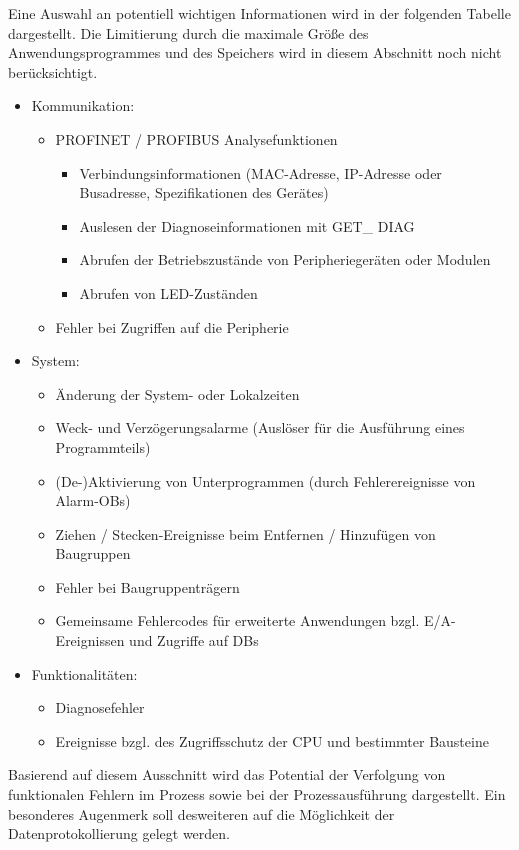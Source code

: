 Eine Auswahl an potentiell wichtigen Informationen wird in der folgenden Tabelle dargestellt. Die Limitierung durch die maximale Größe des Anwendungsprogrammes und des Speichers wird in diesem Abschnitt noch nicht berücksichtigt. 
\begin{itemize}
\item Kommunikation: 
\begin{itemize}
\item PROFINET / PROFIBUS Analysefunktionen 
\begin{itemize}
\item Verbindungsinformationen (MAC-Adresse, IP-Adresse oder Busadresse, Spezifikationen des Gerätes)
\item Auslesen der Diagnoseinformationen mit GET\_ DIAG
\item Abrufen der Betriebszustände von Peripheriegeräten oder Modulen
\item Abrufen von LED-Zuständen
\end{itemize}
\item Fehler bei Zugriffen auf die Peripherie
\end{itemize}

\item System:
\begin{itemize}
\item Änderung der System- oder Lokalzeiten
\item Weck- und Verzögerungsalarme (Auslöser für die Ausführung eines Programmteils)
\item (De-)Aktivierung von Unterprogrammen (durch Fehlerereignisse von Alarm-OBs)
\item Ziehen / Stecken-Ereignisse beim Entfernen / Hinzufügen von Baugruppen
\item Fehler bei Baugruppenträgern 
\item Gemeinsame Fehlercodes für erweiterte Anwendungen bzgl. E/A-Ereignissen und Zugriffe auf DBs
\end{itemize}


\item Funktionalitäten:
\begin{itemize}
\item Diagnosefehler
\item Ereignisse bzgl. des Zugriffsschutz der CPU und bestimmter Bausteine
\end{itemize}
\end{itemize}

Basierend auf diesem Ausschnitt wird das Potential der Verfolgung von funktionalen Fehlern im Prozess sowie bei der Prozessausführung dargestellt. Ein besonderes Augenmerk soll desweiteren auf die Möglichkeit der Datenprotokollierung gelegt werden.

